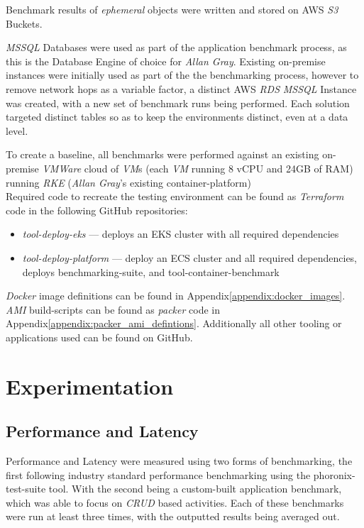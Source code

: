 Benchmark results of \emph{ephemeral} objects were written and stored on AWS \emph{S3} Buckets.

\emph{MSSQL} Databases were used as part of the application benchmark process, as this is the Database Engine of choice for \emph{Allan Gray}.
Existing on-premise instances were initially used as part of the the benchmarking process, however to remove network hops as a variable factor,
a distinct AWS \emph{RDS} \emph{MSSQL} Instance was created, with a new set of benchmark runs being performed.
Each solution targeted distinct tables so as to keep the environments distinct, even at a data level.

To create a baseline, all benchmarks were performed against an existing on-premise \emph{VMWare}\cite{vmware_2022} cloud of \emph{VM}s (each \textit{VM} running 8 vCPU and 24GB of RAM) running \emph{RKE} (\emph{Allan Gray}'s existing container-platform) \\

\noindent Required code to recreate the testing environment can be found as \emph{Terraform} code in the following GitHub repositories:
\begin{itemize}
      \item \emph{tool-deploy-eks}\cite{thameezb_2022} --- deploys an EKS cluster with all required dependencies
      \item \emph{tool-deploy-platform}\cite{thameezb} --- deploy an ECS cluster and all required dependencies, deploys benchmarking-suite, and tool-container-benchmark
\end{itemize}
\emph{Docker} image definitions can be found in Appendix\ref{appendix:docker_images}.
\emph{AMI} build-scripts can be found as \emph{packer} code in Appendix\ref{appendix:packer_ami_defintions}.
Additionally all other tooling or applications used can be found on GitHub\cite{bodhanya_2022}.

\chapter{Experimentation}
\section{Performance and Latency}
Performance and Latency were measured using two forms of benchmarking, the first following industry standard performance benchmarking using the phoronix-test-suite\cite{phoronix_test_suite} tool.
With the second being a custom-built application benchmark, which was able to focus on \emph{CRUD} based activities.
Each of these benchmarks were run at least three times, with the outputted results being averaged out.

